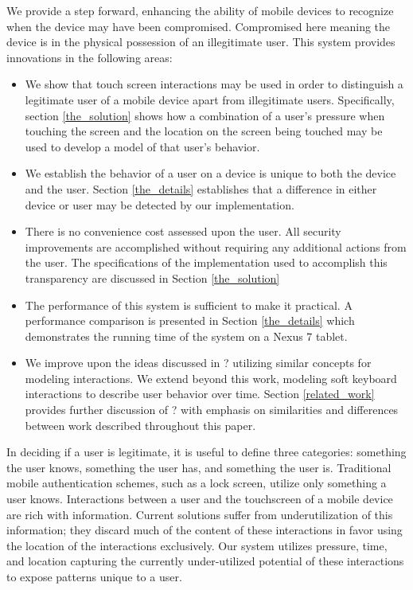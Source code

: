 We provide a step forward, 
enhancing the ability of mobile devices to
recognize when the device may have been compromised.
Compromised here meaning the device is in
the physical possession of an illegitimate user.
This system provides innovations in the following areas:
\begin{itemize}
\item We show that touch screen interactions may be used in order to
  distinguish a legitimate user of a mobile device apart from
  illegitimate users.
  Specifically, section
  \ref{the_solution} %
  shows how a combination of 
  a user's pressure when touching the screen and 
  the location on the screen being touched
  may be used to develop a model of that user's behavior.
\item We establish the behavior of a user on a device
  is unique to both the device and the user.
  Section 
  \ref{the_details} %
  establishes that a difference in either device or user
  may be detected by our implementation.
\item There is no convenience cost assessed upon the user.
  All security improvements are accomplished without requiring any additional
  actions from the user.
  The specifications of the implementation used to accomplish 
  this transparency are discussed in Section
  \ref{the_solution} %
\item The performance of this system is sufficient to make it practical.
  A performance comparison is presented in Section
  \ref{the_details} %
  which demonstrates the running time of the system on 
  a Nexus 7 tablet.
\item We improve upon the ideas discussed in ? %
  utilizing similar concepts for modeling interactions. 
  We extend beyond this work,
  modeling soft keyboard interactions
  to describe user behavior over time.
  Section
  \ref{related_work} %
  provides further discussion of ?%
  with emphasis on similarities and differences
  between work described throughout this paper.
\end{itemize}

In deciding if a user is legitimate,
it is useful to define three categories:
something the user knows,
something the user has, and
something the user is.
Traditional mobile authentication schemes,
such as a lock screen,
utilize only something a user knows.
Interactions between a user
and the touchscreen of a mobile device
are rich with information.
Current solutions suffer from underutilization 
of this information; 
they discard much of the content of these
interactions in favor using
the location of the interactions exclusively.
%
Our system utilizes 
pressure,
time, and
location 
capturing the currently under-utilized potential 
of these interactions to expose patterns unique to a user.

